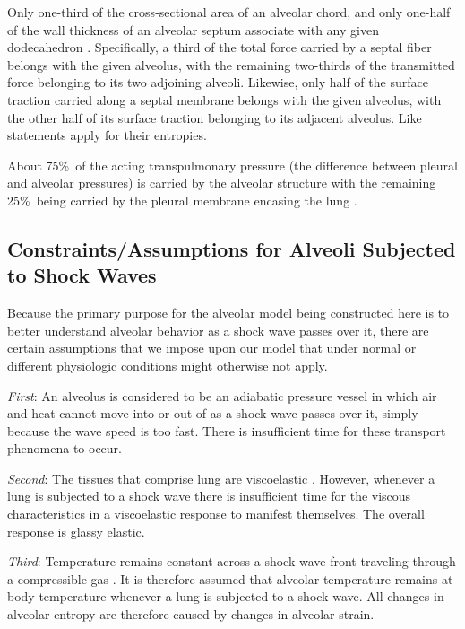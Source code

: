 Only one-third of the cross-sectional area of an alveolar chord, and only one-half of the wall thickness of an alveolar septum associate with any given dodecahedron \cite{Kimmeletal87}.  Specifically, a third of the total force carried by a septal fiber belongs with the  given alveolus, with the remaining two-thirds of the transmitted force belonging to its two adjoining alveoli.  Likewise, only half of the surface traction carried along a septal membrane belongs with the given alveolus, with the other half of its surface traction belonging to its adjacent alveolus.  Like statements apply for their entropies.

About 75\%\ of the acting transpulmonary pressure (the difference between pleural and alveolar pressures) is carried by the alveolar structure with the remaining 25\%\ being carried by the pleural membrane encasing the lung \cite{Hajjietal79}.

\subsection{Constraints\slash Assumptions for Alveoli Subjected to Shock Waves}

Because the primary purpose for the alveolar model being constructed here is to better understand alveolar behavior as a shock wave passes over it, there are certain assumptions that we impose upon our model that under normal or different physiologic conditions might otherwise not apply.  

\textit{First\/}: An alveolus is considered to be an adiabatic pressure vessel in which air and heat cannot move into or out of as a shock wave passes over it, simply because the wave speed is too fast.  There is insufficient time for these transport phenomena to occur.

\textit{Second\/}: The tissues that comprise lung are visco\-elastic \cite{Hildebrandt69,HoppinHildebrandt77}.  However, whenever a lung is subjected to a shock wave there is insufficient time for the viscous characteristics in a visco\-elastic response to manifest themselves.  The overall response is glassy elastic.

\textit{Third\/}: Temperature remains constant across a shock wave-front traveling through a compressible gas \cite{AmesStaff53}.  It is therefore assumed that alveolar temperature remains at body temperature whenever a lung is subjected to a shock wave.  All changes in alveolar entropy are therefore caused by changes in alveolar strain.

